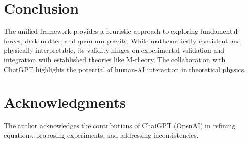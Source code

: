 \documentclass{article}
\begin{document}
\section{Conclusion}
The unified framework provides a heuristic approach to exploring fundamental forces, dark matter, and quantum gravity. While mathematically consistent and physically interpretable, its validity hinges on experimental validation and integration with established theories like M-theory. The collaboration with ChatGPT highlights the potential of human-AI interaction in theoretical physics.

\section*{Acknowledgments}
The author acknowledges the contributions of ChatGPT (OpenAI) in refining equations, proposing experiments, and addressing inconsistencies.



\end{document}
